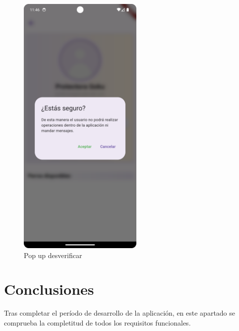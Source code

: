 \documentclass[a4paper, 12pt]{article}
\begin{document}
\begin{figure}[H]
	\begin{center}
		{\includegraphics[width=6cm]{app/AdminUnVerifyPopUp}\par}
		\caption{Pop up desverificar}
	\end{center}
\end{figure}

\newpage
\section{Conclusiones}
Tras completar el período de desarrollo de la aplicación, en este apartado se comprueba la completitud de todos los requisitos funcionales. 
\end{document}
